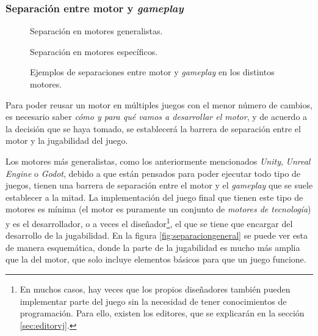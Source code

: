 \subsubsection{Separación entre motor y \textit{gameplay}}
\begin{figure}[t]
\centering
\begin{SubFloat}
	{\label{fig:separaciongeneral}%
		Separación en motores generalistas.}%
\end{SubFloat}
\qquad
\begin{SubFloat}
	{\label{fig:separacionespecificos}%
		Separación en motores específicos.}%
\end{SubFloat}
\caption{Ejemplos de separaciones entre motor y \textit{gameplay} en los distintos motores. \label{fig:separacionesmotgp}}
\end{figure}

Para poder reusar un motor en múltiples juegos con el menor número de cambios, es necesario saber \textit{cómo y para qué vamos a desarrollar el motor}, y de acuerdo a la decisión que se haya tomado, se establecerá la barrera de separación entre el motor y la jugabilidad del juego.

\medskip

Los motores más generalistas, como los anteriormente mencionados \textit{Unity}, \textit{Unreal Engine} o \textit{Godot}, debido a que están pensados para poder ejecutar todo tipo de juegos, tienen una barrera de separación entre el motor y el \textit{gameplay} que se suele establecer a la mitad. La implementación del juego final que tienen este tipo de motores es mínima (el motor es puramente un conjunto de \textit{motores de tecnología}) y es el desarrollador, o a veces el diseñador\footnote{En muchos casos, hay veces que los propios diseñadores también pueden implementar parte del juego sin la necesidad de tener conocimientos de programación. Para ello, existen los editores, que se explicarán en la sección \ref{sec:editorvj}.}, el que se tiene que encargar del desarrollo de la jugabilidad. En la figura \ref{fig:separaciongeneral} se puede ver esta  de manera esquemática, donde la parte de la jugabilidad es mucho más amplia que la del motor, que solo incluye elementos básicos para que un juego funcione. 

